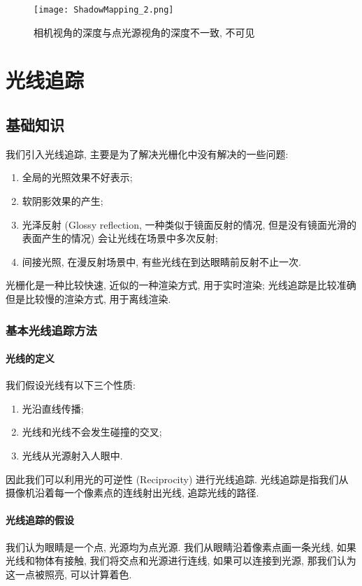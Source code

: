 \begin{figure}[H]
	\centering
	\texttt{[image: ShadowMapping\_2.png]}
	\caption{相机视角的深度与点光源视角的深度不一致, 不可见}
	\label{fig:ShadowMapping_2}
\end{figure}





\chapter{光线追踪}

\section{基础知识}

我们引入光线追踪, 主要是为了解决光栅化中没有解决的一些问题: 
\begin{enumerate}
	\item 全局的光照效果不好表示; 
	\item 软阴影效果的产生; 
	\item 光泽反射 (Glossy reflection, 一种类似于镜面反射的情况, 但是没有镜面光滑的表面产生的情况) 会让光线在场景中多次反射; 
	\item 间接光照, 在漫反射场景中, 有些光线在到达眼睛前反射不止一次. 
\end{enumerate}

光栅化是一种比较快速, 近似的一种渲染方式, 用于实时渲染; 光线追踪是比较准确但是比较慢的渲染方式, 用于离线渲染. 

\subsection{基本光线追踪方法}

\subsubsection{光线的定义}

我们假设光线有以下三个性质: 
\begin{enumerate}
	\item 光沿直线传播; 
	\item 光线和光线不会发生碰撞的交叉; 
	\item 光线从光源射入人眼中. 
\end{enumerate}
因此我们可以利用光的可逆性 (Reciprocity) 进行光线追踪. 光线追踪是指我们从摄像机沿着每一个像素点的连线射出光线, 追踪光线的路径. 

\subsubsection{光线追踪的假设}
我们认为眼睛是一个点, 光源均为点光源. 我们从眼睛沿着像素点画一条光线, 如果光线和物体有接触, 我们将交点和光源进行连线, 如果可以连接到光源, 那我们认为这一点被照亮, 可以计算着色. 

